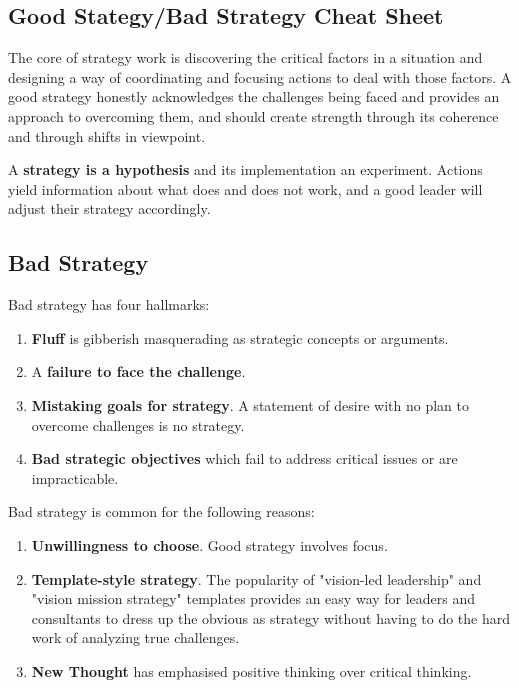 \documentclass{article}
\newenvironment{nosepenumerate}
{ \begin{enumerate}
    \setlength{\itemsep}{0pt}
    \setlength{\parskip}{0pt}
    \setlength{\parsep}{0pt}     }
{ \end{enumerate}                  }
\begin{document}
\begin{center}
     \section{Good Stategy/Bad Strategy Cheat Sheet}
\end{center}

\begin{multicols}{2}

\noindent
The core of strategy work is discovering the critical factors in a situation and designing a way of coordinating and focusing actions to deal with those factors. A good strategy honestly acknowledges the challenges being faced and provides an approach to overcoming them, and should create strength through its coherence and through shifts in viewpoint.

A \textbf{strategy is a hypothesis} and its implementation an experiment. Actions yield information about what does and does not work, and a good leader will adjust their strategy accordingly.


\end{multicols}

\begin{center}
\section{Bad Strategy}
\end{center}

\begin{multicols}{2}

\noindent
Bad strategy has four hallmarks:

\begin{nosepenumerate}
    \item \textbf{Fluff} is gibberish masquerading as strategic concepts or arguments.
    \item A \textbf{failure to face the challenge}. 
    \item \textbf{Mistaking goals for strategy}. A statement of desire with no plan to overcome challenges is no strategy.
    \item \textbf{Bad strategic objectives} which fail to address critical issues or are impracticable.
\end{nosepenumerate}

\noindent
Bad strategy is common for the following reasons:

\begin{nosepenumerate}
    \item \textbf{Unwillingness to choose}. Good strategy involves focus.
    \item \textbf{Template-style strategy}. The popularity of "vision-led leadership" and "vision mission strategy" templates provides an easy way for leaders and consultants to dress up the obvious as strategy without having to do the hard work of analyzing true challenges. 
    \item \textbf{New Thought} has emphasised positive thinking over critical thinking.
\end{nosepenumerate}

\end{multicols}
\end{document}
